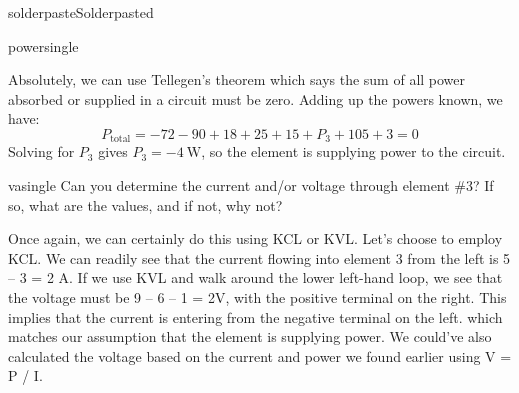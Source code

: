 \begin{mainquestion}{solderpaste}{Solderpasted}
\begin{partquestion}{powersingle}
\begin{answer}
Absolutely, we can use Tellegen’s theorem which says the sum of all power absorbed or supplied in a circuit must be zero.  Adding up the powers known, we have:
\[
P_{\text{total}}=-72-90+18+25+15+P_3+105+3=0
\]
Solving for $P_3$ gives $P_3=\qty{-4}{\watt}$, so the element is supplying power to the circuit. 

\end{answer}
\end{partquestion}

\begin{partquestion}{vasingle}
{Can you determine the current and/or voltage through element \#3?  If so, what are the values, and if not, why not?}

\begin{answer}
Once again, we can certainly do this using KCL or KVL.  Let’s choose to employ KCL. We can readily see that the current flowing into element 3 from the left is 5 – 3 = 2 A.  If we use KVL and walk around the lower left-hand loop, we see that the voltage must be 9 – 6 – 1 = 2V, with the positive terminal on the right. This implies that the current is entering from the negative terminal on the left. which matches our assumption that the element is supplying power. We could’ve also calculated the voltage based on the current and power we found earlier using V = P / I.
\end{answer}
\end{partquestion}

\end{mainquestion}
